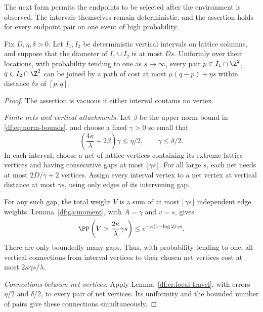 The next form permits the endpoints to be selected after the environment
is observed. The intervals themselves remain deterministic, and the
assertion holds for every endpoint pair on one event of high probability.

\begin{lemma}\label{df:cr:interval-travel}
Fix $D,\eta,\delta>0$. Let $I_1,I_2$ be deterministic vertical intervals
on lattice columns, and suppose that the diameter of $I_1\cup I_2$ is at
most $Ds$. Uniformly over their locations, with probability tending to
one as $s\to\infty$, every pair
$p\in I_1\cap\Z^2$, $q\in I_2\cap\Z^2$ can be joined by a path of
cost at most $\mu(q-p)+\eta s$ within distance $\delta s$ of $[p,q]$.
\end{lemma}

\begin{proof}
The assertion is vacuous if either interval contains no vertex.

\emph{Finite nets and vertical attachments.}
Let $\beta$ be the upper norm bound in \eqref{df:eq:norm-bounds}, and
choose a fixed $\gamma>0$ so small that
\[
 \left(\frac{4\kappa}{\lambda}+2\beta\right)\gamma\le\eta/2,
 \qquad \gamma\le\delta/2.
\]
In each interval, choose a net of lattice vertices containing its extreme
lattice vertices and having consecutive gaps at most
$\lfloor\gamma s\rfloor$. For all large $s$, each net needs at most
$2D/\gamma+2$ vertices. Assign every interval vertex to a net vertex at
vertical distance at most $\gamma s$, using only edges of its intervening gap.

For any such gap, the total weight $V$ is a sum of at most
$\lfloor\gamma s\rfloor$ independent edge weights.
Lemma~\ref{df:ga:moment}, with $A=\gamma$ and $v=s$, gives
\[
 \PP\left(V>\frac{2\kappa}{\lambda}\gamma s\right)
 \le e^{-\kappa(1-\log2)\gamma s}.
\]
There are only boundedly many gaps. Thus, with probability tending to
one, all vertical connections from interval vertices to their chosen
net vertices cost at most $2\kappa\gamma s/\lambda$.

\emph{Connections between net vertices.}
Apply Lemma~\ref{df:cr:local-travel}, with errors $\eta/2$ and $\delta/2$,
to every pair of net vertices. Its uniformity and the bounded number
of pairs give these connections simultaneously.


\end{proof}
